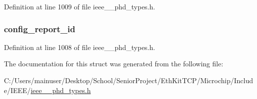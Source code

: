 Definition at line 1009 of file ieee\+\_\+\_\+phd\+\_\+types.\+h.

\hypertarget{struct___config_report_a53985454c469ab7ba57b64e680cf8c73}{}
\subsubsection[{config\+\_\+report\+\_\+id}]{ config\+\_\+report\+\_\+id}\label{struct___config_report_a53985454c469ab7ba57b64e680cf8c73}


Definition at line 1008 of file ieee\+\_\+\_\+phd\+\_\+types.\+h.



The documentation for this struct was generated from the following file\+:\begin{DoxyCompactItemize}
\item 
C\+:/\+Users/mainuser/\+Desktop/\+School/\+Senior\+Project/\+Eth\+Kit\+T\+C\+P/\+Microchip/\+Include/\+I\+E\+E\+E/\hyperlink{ieee__11073__phd__types_8h}{ieee\+\_\+\_\+phd\+\_\+types.\+h}\end{DoxyCompactItemize}
